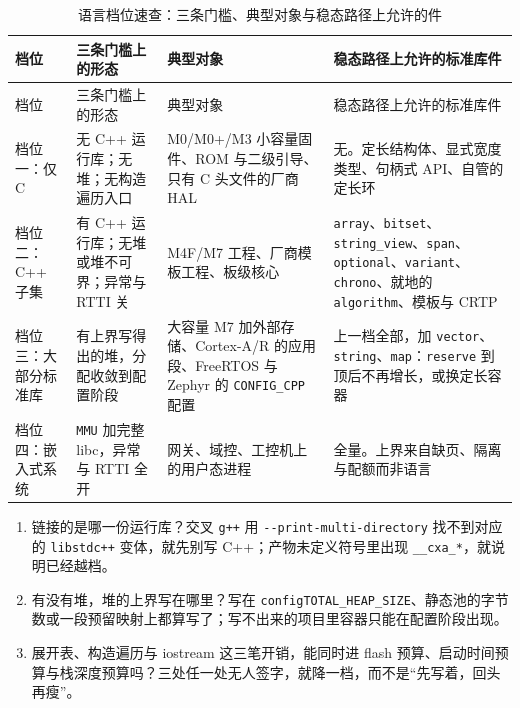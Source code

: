 \documentclass[12pt,a4paper,fontset=fandol]{ctexbook}
\newcommand{\Tp}[1]{\texttt{#1}}
\newcommand{\Opt}[1]{\texttt{-\/-#1}}
\newcommand{\Bk}{\discretionary{}{}{}}
\newcommand{\Lang}[1]{\textsf{#1}}
\newcommand{\CL}{\Lang{C}}
\newcommand{\CPP}{\Lang{C++}}
\begin{document}
\begin{longtable}{>{\raggedright\arraybackslash\footnotesize}p{}>{\raggedright\arraybackslash\footnotesize}p{}>{\raggedright\arraybackslash\footnotesize}p{}>{\raggedright\arraybackslash\footnotesize}p{}}
\caption{语言档位速查：三条门槛、典型对象与稳态路径上允许的件}\label{tab:ch01-langtier} \\
\toprule
档位 & 三条门槛上的形态 & 典型对象 & 稳态路径上允许的标准库件 \\
\midrule
\endfirsthead
\toprule
档位 & 三条门槛上的形态 & 典型对象 & 稳态路径上允许的标准库件 \\
\midrule
\endhead
\bottomrule
\endfoot
\endlastfoot
档位一：仅 \CL{} & 无 \CPP{} 运行库；无堆；无构造遍历入口 & M0/M0+/M3 小容量固件、ROM 与二级引导、只有 C 头文件的厂商 HAL & 无。定长结构体、显式宽度类型、句柄式 API、自管的定长环 \\
档位二：\CPP{} 子集 & 有 \CPP{} 运行库；无堆或堆不可界；异常与 RTTI 关 & M4F/M7 工程、厂商模板工程、板级核心 & \Tp{array}、\Tp{bitset}、\Tp{string\_view}、\Tp{span}、\Tp{optional}、\Tp{variant}、\Tp{chrono}、就地的 \Tp{algorithm}、模板与 CRTP \\
档位三：大部分标准库 & 有上界写得出的堆，分配收敛到配置阶段 & 大容量 M7 加外部存储、Cortex-A/R 的应用段、FreeRTOS 与 Zephyr 的 \Tp{CONFIG{\Bk}\_CPP} 配置 & 上一档全部，加 \Tp{vector}、\Tp{string}、\Tp{map}：\Tp{reserve} 到顶后不再增长，或换定长容器 \\
档位四：嵌入式系统 & \Tp{MMU} 加完整 libc，异常与 RTTI 全开 & 网关、域控、工控机上的用户态进程 & 全量。上界来自缺页、隔离与配额而非语言 \\
\end{longtable}

\begin{guideline}[title={定档三问，按顺序问}]
\begin{enumerate}
\item 链接的是哪一份运行库？交叉 \Tp{g++} 用 \Opt{print-multi-directory} 找不到对应的 \Tp{libstdc++} 变体，就先别写 \CPP{}；产物未定义符号里出现 \Tp{\_\_cxa\_*}，就说明已经越档。
\item 有没有堆，堆的上界写在哪里？写在 \Tp{configTOTAL{\Bk}\_HEAP{\Bk}\_SIZE}、静态池的字节数或一段预留映射上都算写了；写不出来的项目里容器只能在配置阶段出现。
\item 展开表、构造遍历与 iostream 这三笔开销，能同时进 flash 预算、启动时间预算与栈深度预算吗？三处任一处无人签字，就降一档，而不是``先写着，回头再瘦''。
\end{enumerate}
\end{guideline}
\end{document}
